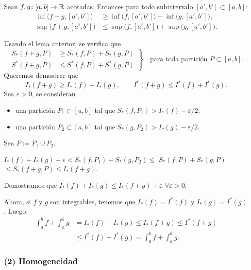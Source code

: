 \documentclass[11pt,a4paper]{article}
\begin{document}
\begin{lema}
Sean $f,g\colon[a,b]\to\mathbb{R}$ acotadas. Entonces para todo subintervalo $[a',b']\subset[a,b]$:
\begin{align*}
  \inf\bigl(f+g,[a',b']\bigr)&\ge\inf\bigl(f,[a',b']\bigr)+\inf\bigl(g,[a',b']\bigr),\\
  \sup\bigl(f+g,[a',b']\bigr)&\le\sup\bigl(f,[a',b']\bigr)+\sup\bigl(g,[a',b']\bigr).
\end{align*}
\end{lema}

\begin{demo}[Demostración de (1)]
Usando el lema anterior, se verifica que
\[
  \left.\begin{aligned}
    S_*(f+g,P)&\ge S_*(f,P)+S_*(g,P)\\
    S^*(f+g,P)&\le S^*(f,P)+S^*(g,P)
  \end{aligned}\right\}\quad\text{para toda partición } P\subset[a,b].
\]
Queremos demostrar que
\[
  I_*(f+g)\ge I_*(f)+I_*(g),\qquad I^*(f+g)\le I^*(f)+I^*(g).
\]
Sea $\varepsilon>0$, se consideran
\begin{itemize}
  \item una partición $P_1\subset[a,b]$ tal que $S_*(f,P_1)>I_*(f)-\varepsilon/2$;
  \item una partición $P_2\subset[a,b]$ tal que $S_*(g,P_2)>I_*(g)-\varepsilon/2$.
\end{itemize}
Sea $P:=P_1\cup P_2$.
\begin{center}
$I_*(f)+I_*(g)-\varepsilon < S_*(f,P_1)+S_*(g,P_2)\le$ $S_*(f,P)+S_*(g,P)$\\[4pt]
$\le S_*(f+g,P)\le I_*(f+g)$.
\end{center}
Demostramos que $I_*(f)+I_*(g)\le I_*(f+g)+\varepsilon$ $\forall\varepsilon>0$.

Ahora, si $f$ y $g$ son integrables, tenemos que $I_*(f)=I^*(f)$ y $I_*(g)=I^*(g)$. Luego:
\begin{align*}
  \int_a^b f+\int_a^b g&=I_*(f)+I_*(g)\le I_*(f+g)\le I^*(f+g)\\
  &\le I^*(f)+I^*(g)=\int_a^b f+\int_a^b g.
\end{align*}
\end{demo}

\subsubsection*{(2) Homogeneidad}
\end{document}
